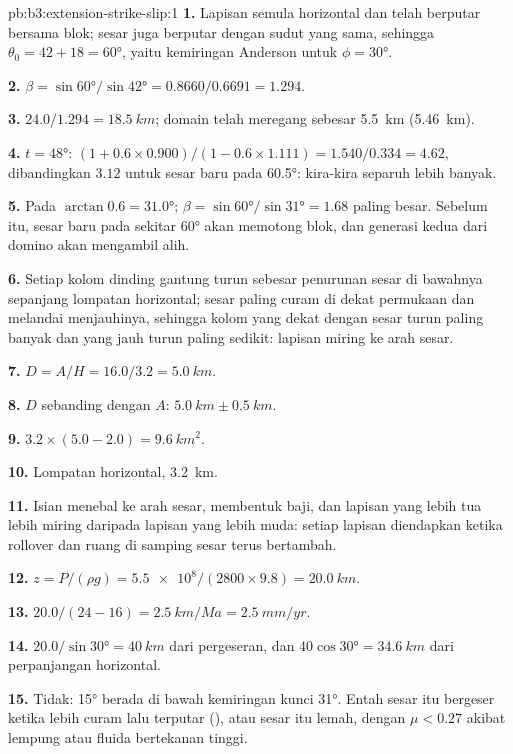\begin{solution}{pb:b3:extension-strike-slip:1}
\textbf{1.} Lapisan semula horizontal dan telah berputar bersama blok; sesar
juga berputar dengan sudut yang sama, sehingga $\theta_0 = 42 + 18 = \ang{60}$,
yaitu kemiringan Anderson untuk $\phi = \ang{30}$.

\textbf{2.} $\beta = \sin\ang{60}/\sin\ang{42} = 0.8660/0.6691 = 1.294$.

\textbf{3.} $24.0/1.294 = \qty{18.5}{km}$; domain telah meregang sebesar
\qty{5.5}{km} (\qty{5.46}{km}).

\textbf{4.} $t = \ang{48}$: $(1 + 0.6\times0.900)/(1 - 0.6\times1.111) =
1.540/0.334 = 4.62$, dibandingkan $3.12$ untuk sesar baru pada \ang{60.5}: kira-kira
separuh lebih banyak.

\textbf{5.} Pada $\arctan0.6 = \ang{31.0}$; $\beta = \sin\ang{60}/\sin\ang{31}
= 1.68$ paling besar. Sebelum itu, sesar baru pada sekitar \ang{60} akan
memotong blok, dan generasi kedua dari domino akan mengambil alih.

\textbf{6.} Setiap kolom dinding gantung turun sebesar penurunan sesar di
bawahnya sepanjang lompatan horizontal; sesar paling curam di dekat permukaan
dan melandai menjauhinya, sehingga kolom yang dekat dengan sesar turun paling
banyak dan yang jauh turun paling sedikit: lapisan miring ke arah sesar.

\textbf{7.} $D = A/H = 16.0/3.2 = \qty{5.0}{km}$.

\textbf{8.} $D$ sebanding dengan $A$: $\qty{5.0}{km} \pm \qty{0.5}{km}$.

\textbf{9.} $3.2\times(5.0 - 2.0) = \qty{9.6}{km^2}$.

\textbf{10.} Lompatan horizontal, \qty{3.2}{km}.

\textbf{11.} Isian menebal ke arah sesar, membentuk baji, dan lapisan yang lebih
tua lebih miring daripada lapisan yang lebih muda: setiap lapisan diendapkan
ketika rollover dan ruang di samping sesar terus bertambah.

\textbf{12.} $z = P/(\rho g) = \num{5.5e8}/(2800\times9.8) = \qty{20.0}{km}$.

\textbf{13.} $20.0/(24 - 16) = \qty{2.5}{km/Ma} = \qty{2.5}{mm/yr}$.

\textbf{14.} $20.0/\sin\ang{30} = \qty{40}{km}$ dari pergeseran, dan $40\cos\ang{30} =
\qty{34.6}{km}$ dari perpanjangan horizontal.

\textbf{15.} Tidak: \ang{15} berada di bawah kemiringan kunci \ang{31}. Entah sesar
itu bergeser ketika lebih curam lalu terputar (), atau sesar
itu lemah, dengan $\mu < 0.27$ akibat lempung atau fluida bertekanan tinggi.


\end{solution}

